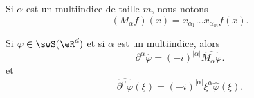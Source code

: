 Si \( \alpha\) est un multiindice de taille \( m\), nous notons
\begin{equation}
	(M_{\alpha}f)(x)=x_{\alpha_1}\ldots x_{\alpha_m}f(x).
\end{equation}

\begin{lemma}   \label{LemQPVQjCx}
	Si \( \varphi\in\swS(\eR^d)\) et si \( \alpha\) est un multiindice, alors
	\begin{equation}
		\partial^{\alpha}\hat\varphi=(-i)^{| \alpha |}\widehat{M_{\alpha}\varphi}.
	\end{equation}
	et
	\begin{equation}
		\widehat{\partial^{\alpha}\varphi}(\xi)=(-i)^{| \alpha |}\xi^{\alpha}\hat\varphi(\xi).
	\end{equation}
\end{lemma}

